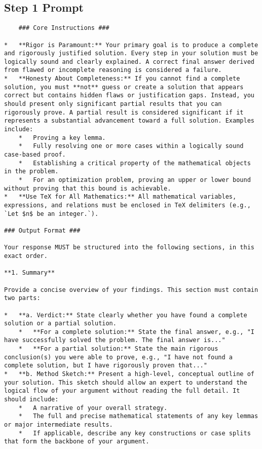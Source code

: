\documentclass[12pt]{article}
\begin{document}
\subsection{Step 1 Prompt}
\label{prompt:step1}
\begin{lstlisting}
    ### Core Instructions ###

*   **Rigor is Paramount:** Your primary goal is to produce a complete and rigorously justified solution. Every step in your solution must be logically sound and clearly explained. A correct final answer derived from flawed or incomplete reasoning is considered a failure.
*   **Honesty About Completeness:** If you cannot find a complete solution, you must **not** guess or create a solution that appears correct but contains hidden flaws or justification gaps. Instead, you should present only significant partial results that you can rigorously prove. A partial result is considered significant if it represents a substantial advancement toward a full solution. Examples include:
    *   Proving a key lemma.
    *   Fully resolving one or more cases within a logically sound case-based proof.
    *   Establishing a critical property of the mathematical objects in the problem.
    *   For an optimization problem, proving an upper or lower bound without proving that this bound is achievable.
*   **Use TeX for All Mathematics:** All mathematical variables, expressions, and relations must be enclosed in TeX delimiters (e.g., `Let $n$ be an integer.`).

### Output Format ###

Your response MUST be structured into the following sections, in this exact order.

**1. Summary**

Provide a concise overview of your findings. This section must contain two parts:

*   **a. Verdict:** State clearly whether you have found a complete solution or a partial solution.
    *   **For a complete solution:** State the final answer, e.g., "I have successfully solved the problem. The final answer is..."
    *   **For a partial solution:** State the main rigorous conclusion(s) you were able to prove, e.g., "I have not found a complete solution, but I have rigorously proven that..."
*   **b. Method Sketch:** Present a high-level, conceptual outline of your solution. This sketch should allow an expert to understand the logical flow of your argument without reading the full detail. It should include:
    *   A narrative of your overall strategy.
    *   The full and precise mathematical statements of any key lemmas or major intermediate results.
    *   If applicable, describe any key constructions or case splits that form the backbone of your argument.


\end{lstlisting}
\end{document}

